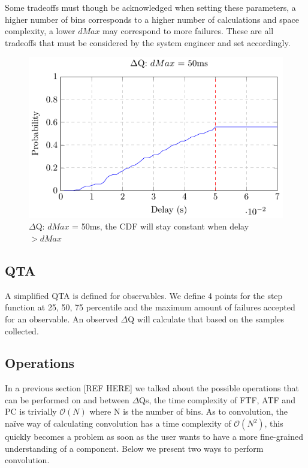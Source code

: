 Some tradeoffs must though be acknowledged when setting these parameters, a higher number of bins corresponds to a higher number of calculations and space complexity, a lower $dMax$ may correspond to more failures. These are all tradeoffs that must be considered by the system engineer and set accordingly.
    \begin{figure}[H]
        \begin{center}
            \includegraphics[scale = 1.2]{tikz/cdf_dmax.pdf}
        \end{center}
        \caption{$\Delta$Q: $dMax$ = 50ms, the CDF will stay constant when delay $> dMax$}
    \end{figure}

    \subsection{QTA}
        A simplified QTA is defined for observables. We define 4 points for the step function at 25, 50, 75 percentile and the maximum amount of failures accepted for an observable. An observed $\Delta$Q will calculate that based on the samples collected. 

    \subsection{Operations}
    In a previous section [REF HERE] we talked about the possible operations that can be performed on and between $\Delta$Qs, the time complexity of FTF, ATF and PC is trivially $\mathcal{O}(N)$ where N is the number of bins. As to convolution, the naïve way of calculating convolution has a time complexity of $\mathcal{O}(N^2)$, this quickly becomes a problem as soon as the user wants to have a more fine-grained understanding of a component. Below we present two ways to perform convolution.

